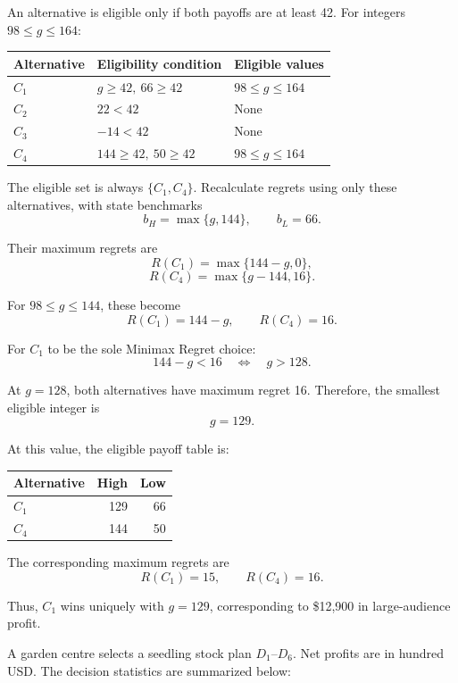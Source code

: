 An alternative is eligible only if both payoffs
are at least 42. For integers $98\le g\le164$:

\begin{center}
\begin{tabular}{lll}\toprule
Alternative & Eligibility condition & Eligible values\\\midrule
$C_1$ & $g\ge42,\ 66\ge42$ & $98\le g\le164$\\
$C_2$ & $22<42$ & None\\
$C_3$ & $-14<42$ & None\\
$C_4$ & $144\ge42,\ 50\ge42$ & $98\le g\le164$\\
\bottomrule
\end{tabular}
\end{center}

The eligible set is always $\{C_1,C_4\}$.
Recalculate regrets using only these alternatives,
with state benchmarks
\[
b_H=\max\{g,144\},\qquad b_L=66.
\]

Their maximum regrets are
\[
R(C_1)=\max\{144-g,0\},
\]
\[
R(C_4)=\max\{g-144,16\}.
\]

For $98\le g\le144$, these become
\[
R(C_1)=144-g,\qquad R(C_4)=16.
\]

For $C_1$ to be the sole Minimax Regret choice:
\[
144-g<16
\quad\Longleftrightarrow\quad g>128.
\]

At $g=128$, both alternatives have maximum regret 16.
Therefore, the smallest eligible integer is
\[
\boxed{g=129}.
\]

At this value, the eligible payoff table is:

\begin{center}\small\setlength{\tabcolsep}{4pt}
\begin{tabular}{lrr}\toprule
Alternative & High & Low\\ \midrule
$C_1$ & 129 & 66\\
$C_4$ & 144 & 50\\
\bottomrule
\end{tabular}
\end{center}

The corresponding maximum regrets are
\[
R(C_1)=15,\qquad R(C_4)=16.
\]

Thus, $C_1$ wins uniquely with $g=129$,
corresponding to \$12,900 in large-audience profit.
\secInicio[sec:q2]



A garden centre selects a seedling stock plan $D_1$--$D_6$. Net profits are in hundred USD. The decision statistics are summarized below:

